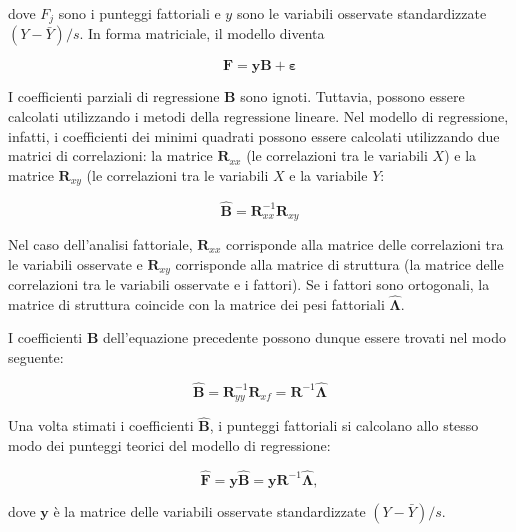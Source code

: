 \documentclass[
  11pt,
]{krantz}
\begin{document}
dove \(F_j\) sono i punteggi fattoriali e \(y\) sono le variabili osservate standardizzate \((Y-\bar{Y})/s\). In forma matriciale, il modello diventa

\[
\textbf{F} = \textbf{y} \textbf{B} +
\boldsymbol{\varepsilon}
\]

I coefficienti parziali di regressione \textbf{B} sono ignoti. Tuttavia, possono essere calcolati utilizzando i metodi della regressione lineare. Nel modello di regressione, infatti, i coefficienti dei minimi quadrati possono essere calcolati utilizzando due matrici di correlazioni: la matrice \(\textbf{R}_{xx}\) (le correlazioni tra le variabili \(X\)) e la matrice \(\textbf{R}_{xy}\) (le correlazioni tra le variabili \(X\) e la variabile \(Y\):

\[
\hat{\textbf{B}} = \textbf{R}_{xx}^{-1}\textbf{R}_{xy}
\]

Nel caso dell'analisi fattoriale, \(\textbf{R}_{xx}\) corrisponde alla matrice delle correlazioni tra le variabili osservate e \(\textbf{R}_{xy}\) corrisponde alla matrice di struttura (la matrice delle correlazioni tra le variabili osservate e i fattori). Se i fattori sono ortogonali, la matrice di struttura coincide con la matrice dei pesi fattoriali \(\hat{\boldsymbol{\Lambda}}\).

I coefficienti \textbf{B} dell'equazione precedente possono dunque essere trovati nel modo seguente:

\begin{equation}
\hat{\textbf{B}} = \textbf{R}_{yy}^{-1}\textbf{R}_{xf}=
\textbf{R}^{-1}\hat{\boldsymbol{\Lambda}}
\end{equation}

Una volta stimati i coefficienti \(\hat{\textbf{B}}\), i punteggi fattoriali si calcolano allo stesso modo dei punteggi teorici del modello di regressione:

\begin{equation}
\hat{\textbf{F}} = \textbf{y} \hat{\textbf{B}} = \textbf{y}
\textbf{R}^{-1}\hat{\boldsymbol{\Lambda}},
\end{equation}

dove \(\textbf{y}\) è la matrice delle variabili osservate standardizzate \((Y-\bar{Y})/s\).

  

\printindex
\end{document}
